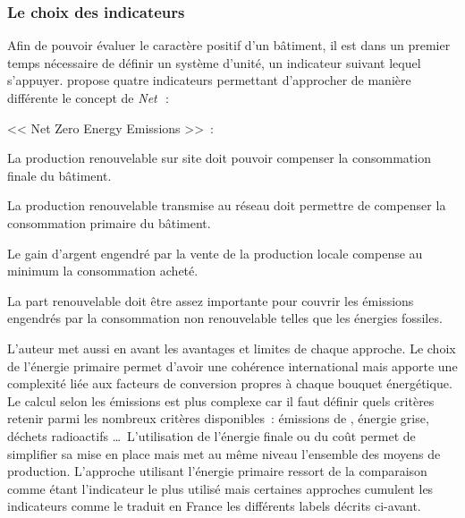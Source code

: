 \subsubsection{Le choix des indicateurs} %
\label{ssub:le_choix_des_indicateurs}
Afin de pouvoir évaluer le caractère positif d’un bâtiment, il est dans un premier
temps nécessaire de définir un système d’unité, un indicateur suivant lequel
s’appuyer. \textcite{Torcellini2006} propose quatre indicateurs permettant
d’approcher de manière différente le concept de \textit{Net}\,~:
\begin{blockdescription}{<< Net Zero Energy Emissions >>~:}
    \item[\enquote{Net Zero Site Energy}~:] La production renouvelable sur site
          doit pouvoir compenser la consommation finale du bâtiment.
    \item[\enquote{Net Zero Source Energy}~:] La production renouvelable transmise au réseau
          doit permettre de compenser la consommation primaire du bâtiment.
    \item[\enquote{Net Zero Energy Costs}~:] Le gain d’argent engendré par la vente
           de la production locale compense au minimum la consommation acheté.
    \item[\enquote{Net Zero Energy Emissions}~:] La part renouvelable doit être assez
           importante pour couvrir les émissions engendrés par la consommation non
           renouvelable telles que les énergies fossiles.
\end{blockdescription}
L’auteur met aussi en avant les avantages et limites de chaque approche. Le choix de
l’énergie primaire permet d’avoir une cohérence international mais apporte une complexité
liée aux facteurs de conversion propres à chaque bouquet énergétique. Le calcul selon les
émissions est plus complexe car il faut définir quels critères retenir parmi les nombreux
critères disponibles~: émissions de , énergie grise, déchets radioactifs
\dots\ L’utilisation de l’énergie finale ou du coût permet de simplifier sa mise en place
mais met au même niveau l’ensemble des moyens de production. L’approche utilisant
l’énergie primaire ressort de la comparaison comme étant l’indicateur le plus utilisé mais
certaines approches cumulent les indicateurs comme le traduit en France les différents
labels décrits ci-avant.


